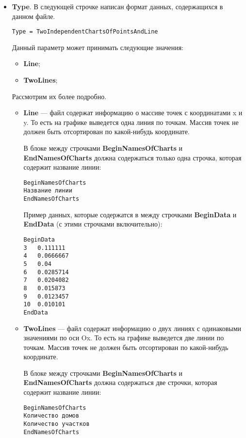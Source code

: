 \documentclass[a4paper,12pt]{article}
\begin{document}
\begin{itemize}
\item \textbf{Type}.
В следующей строчке написан формат данных, содержащихся в данном файле.
\begin{lstlisting}[label=Line03,caption=Строчка с описанием типа данных в файле]
Type = TwoIndependentChartsOfPointsAndLine
\end{lstlisting}
Данный параметр может принимать следующие значения:

\begin{itemize}
\item \textbf{Line};
\item \textbf{TwoLines};
\end{itemize}

Рассмотрим их более подробно.

\begin{itemize}
\item \textbf{Line} --- файл содержат информацию о массиве точек с координатами x и y. То есть на графике выведется одна линия по точкам. Массив точек не должен быть отсортирован по какой-нибудь координате.

В блоке между строчками \textbf{BeginNamesOfCharts} и \textbf{EndNamesOfCharts} должна содержаться только одна строчка, которая содержит название линии:
\begin{lstlisting}[label=Line03_2,caption=Для Line ]
BeginNamesOfCharts
Название линии
EndNamesOfCharts
\end{lstlisting}

Пример данных, которые содержатся в между строчками \textbf{BeginData} и \textbf{EndData} (с этими строчками включительно):
\begin{lstlisting}[label=Line03_3,caption=Для Line ]
BeginData
3	0.111111
4	0.0666667
5	0.04
6	0.0285714
7	0.0204082
8	0.015873
9	0.0123457
10	0.010101
EndData
\end{lstlisting}

\item \textbf{TwoLines} --- файл содержат информацию о двух линиях с одинаковыми значениями по оси Ox. То есть на графике выведется две линии по точкам. Массив точек не должен быть отсортирован по какой-нибудь координате.

В блоке между строчками \textbf{BeginNamesOfCharts} и \textbf{EndNamesOfCharts} должна содержаться две строчки, которая содержит название линии:
\begin{lstlisting}[label=Line03_4,caption=Для Line ]
BeginNamesOfCharts
Количество домов
Количество участков
EndNamesOfCharts
\end{lstlisting}


\end{itemize}
\end{itemize}
\end{document}
